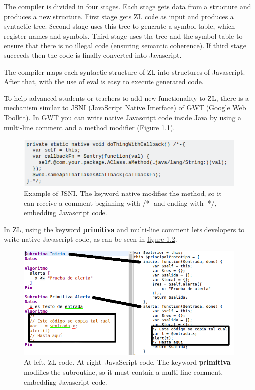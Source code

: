 \documentclass{report}
\begin{document}
	The compiler is divided in four stages. Each stage gets data from a structure and produces a new structure. First stage gets ZL code as input and produces a syntactic tree. Second stage uses this tree to generate a symbol table, which register names and symbols. Third stage uses the tree and the symbol table to ensure that there is no illegal code (ensuring semantic coherence). If third stage succeeds then the code is finally converted into Javascript.
	
	The compiler maps each syntactic structure of ZL into structures of Javascript. After that, with the use of eval\cite{javascripteval} is easy to execute generated code.
	
	To help advanced students or teachers to add new functionality to ZL, there is a mechanism similar to JSNI (JavaScript Native Interface) of GWT (Google Web Toolkit). In GWT you can write native Javascript code inside Java by using a multi-line comment and a method modifier (\hyperref[fig:jnsiexample]{Figure 1.1}).

\begin{figure}
\centering
\includegraphics[width=1\linewidth]{jnsiexample}
\caption[Example of JSNI]{Example of JSNI. The keyword native modifies the method, so it can receive a comment beginning with /*- and ending with -*/, embedding Javascript code.}
\label{fig:jnsiexample}
\end{figure}

	In ZL, using the keyword \textbf{primitiva} and multi-line comment lets developers to write native Javascript code, as can be seen in \hyperref[fig:zlcode]{figure 1.2}.
	
	\begin{figure}
	\label{fig:zlcode}
	\centering
	\includegraphics[width=1\linewidth]{zlyjs}
	\caption[Native JavaScript code written in ZL]{At left, ZL code. At right, JavaScript code. The keyword \textbf{primitiva} modifies the subroutine, so it must contain a multi line comment, embedding Javascript code.}
	\end{figure}
	
\end{document}
